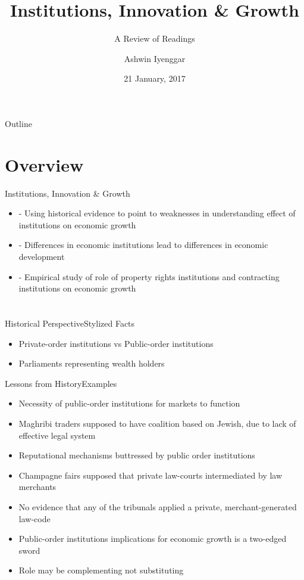 \documentclass{beamer}
\title{Institutions, Innovation \& Growth}
\subtitle{A Review of Readings}
\author{Ashwin Iyenggar}
\institute[Indian Institute of Management Bangalore] 
{
  Corporate Strategy and Policy\\
  Indian Institute of Management Bangalore
}
\date{21 January, 2017}
\begin{document}
\begin{frame}
  \titlepage
\end{frame}

\begin{frame}{Outline}
  \tableofcontents
\end{frame}

\section{Overview}
\begin{frame}{Institutions, Innovation \& Growth}{}
\begin{itemize}
\item{\cite{Ogilvie2014}} - Using historical evidence to point to weaknesses in understanding effect of institutions on economic growth
\item{\cite{Acemoglu2005}} - Differences in economic institutions lead to differences in economic development
\item{\cite{Acemoglu2003}} - Empirical study of role of property rights institutions and contracting institutions on economic growth
\end{itemize}
\end{frame}

\section{\cite{Ogilvie2014}}
\begin{frame}{Historical Perspective}{Stylized Facts}
\begin{itemize}
\item{Private-order institutions vs Public-order institutions}
\item{Parliaments representing wealth holders}
\end{itemize}
\end{frame}

\begin{frame}{Lessons from History}{Examples}
\begin{itemize}
\item{Necessity of public-order institutions for markets to function}
\item{Maghribi traders supposed to have coalition based on Jewish, due to lack of effective legal system}
\item{Reputational mechanisms buttressed by public order institutions}
\item{Champagne fairs supposed that  private law-courts intermediated by law merchants}
\item{No evidence that any of the tribunals applied a private, merchant-generated law-code}
\item{Public-order institutions implications for economic growth is a two-edged sword}
\item{Role may be complementing not substituting}
\end{itemize}
\end{frame}
\end{document}
